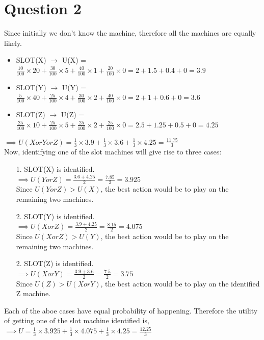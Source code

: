 \documentclass[letter, 10pt]{article}
\begin{document}
\section*{Question 2}
Since initially we don't know the machine, therefore all the machines are equally likely.
\begin{itemize}
    \item SLOT(X) $\rightarrow$ U(X) = $\frac{10}{100}\times20+\frac{30}{100}\times5+\frac{40}{100}\times1+\frac{20}{100}\times0 = 2+1.5+0.4+0 = 3.9$
    \item SLOT(Y) $\rightarrow$ U(Y) = $\frac{5}{100}\times40+\frac{25}{100}\times4+\frac{30}{100}\times2+\frac{40}{100}\times0 = 2+1+0.6+0 = 3.6$
    \item SLOT(Z) $\rightarrow$ U(Z) = $\frac{25}{100}\times10+\frac{25}{100}\times5+\frac{25}{100}\times2+\frac{25}{100}\times0 = 2.5+1.25+0.5+0 = 4.25$
\end{itemize}
$\implies U(X or Y or Z) = \frac{1}{3}\times3.9+\frac{1}{3}\times3.6+\frac{1}{3}\times4.25 = \frac{11.75}{3}$\\

Now, identifying one of the slot machines will give rise to three cases:
\begin{itemize}
    \item[1.] SLOT(X) is identified.\\
    $\implies U(Y or Z) = \frac{3.6 + 4.25}{2} = \frac{7.85}{2} = 3.925$\\
    Since $U(Y or Z)>U(X)$, the best action would be to play on the remaining two machines.
    \item[2.] SLOT(Y) is identified.\\
    $\implies U(X or Z) = \frac{3.9 + 4.25}{2} = \frac{8.15}{2} = 4.075$\\
    Since $U(X or Z)>U(Y)$, the best action would be to play on the remaining two machines.
    \item[2.] SLOT(Z) is identified.\\
    $\implies U(X or Y) = \frac{3.9 + 3.6}{2} = \frac{7.5}{2} = 3.75$\\
    Since $U(Z)>U(XorY)$, the best action would be to play on the identified Z machine.
\end{itemize}

Each of the aboe cases have equal probability of happening. Therefore the utility of getting one of the slot machine identified is,\\
$\implies U = \frac{1}{3}\times3.925+\frac{1}{3}\times4.075+\frac{1}{3}\times4.25 = \frac{12.25}{3}$\\
\end{document}
